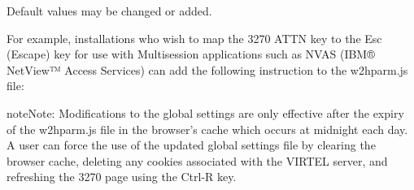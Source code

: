 \documentclass[letterpaper,10pt,english]{sphinxmanual}
\begin{document}
\begin{sphinxVerbatim}[commandchars=\\\{\}]
        
       
    \PYG{p}{[}\PYG{p}{]}
\end{sphinxVerbatim}


Default values may be changed or added.

For example, installations who wish to map the 3270 ATTN key to the Esc (Escape) key for use with Multisession applications such as NVAS (IBM® NetView™ Access Services) can add the following instruction to the w2hparm.js file:

\begin{sphinxVerbatim}[commandchars=\\\{\}]
\end{sphinxVerbatim}

\begin{sphinxadmonition}{note}{Note:}
Modifications to the global settings are only effective after the expiry of the w2hparm.js file in the browser’s cache which occurs at midnight each day. A user can force the use of the updated global settings file by clearing the browser cache, deleting any cookies associated with the VIRTEL server, and refreshing the 3270 page using the Ctrl-R key.
\end{sphinxadmonition}
\end{document}

